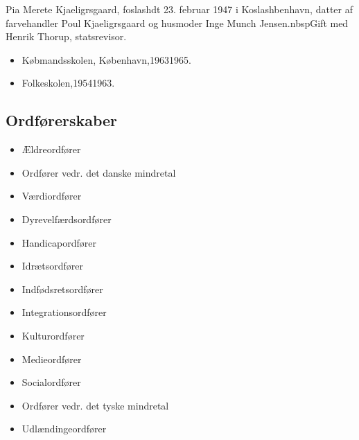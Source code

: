 \documentclass[11pt, a4paper]{awesome-cv}
\begin{document}
\makecvheader[R]
\makelettertitle
\begin{cvletter}
Pia Merete Kjaeligrsgaard, foslashdt 23. februar 1947 i Koslashbenhavn, datter af farvehandler Poul Kjaeligrsgaard og husmoder Inge Munch Jensen.nbspGift med Henrik Thorup, statsrevisor.

\begin{itemize}
\item Købmandsskolen, København,19631965.
\item Folkeskolen,19541963.
\end{itemize}
\subsection*{Ordførerskaber}
\begin{itemize}
\item Ældreordfører
\item Ordfører vedr. det danske mindretal
\item Værdiordfører
\item Dyrevelfærdsordfører
\item Handicapordfører
\item Idrætsordfører
\item Indfødsretsordfører
\item Integrationsordfører
\item Kulturordfører
\item Medieordfører
\item Socialordfører
\item Ordfører vedr. det tyske mindretal
\item Udlændingeordfører
\end{itemize}

\end{cvletter}
\end{document}
